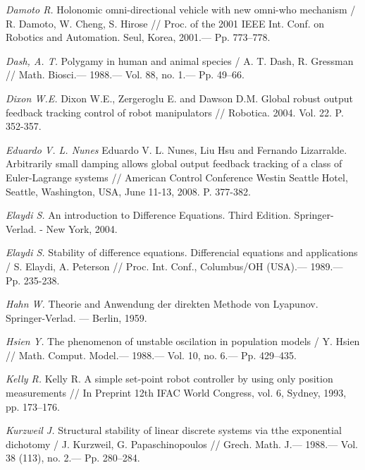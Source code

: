 \begin{thebibliography}{10}
	{\it Damoto R.} Holonomic omni-directional vehicle with new omni-who mechanism / R. Damoto, W. Cheng, S. Hirose // Proc. of the 2001 IEEE Int. Conf. on Robotics and Automation. Seul, Korea, 2001.— Pp. 773–778.
	
	
	{\it Dash, A. T.} Polygamy in human and animal species / A. T. Dash, R. Gressman // Math. Biosci.— 1988.— Vol. 88, no. 1.— Pp. 49–66.
	
	{\it Dixon W.E.} Dixon W.E., Zergeroglu E. and Dawson D.M. Global robust output feedback tracking control of robot manipulators // Robotica. 2004. Vol. 22. P. 352-357.
	
	{\it Eduardo V. L. Nunes} Eduardo V. L. Nunes, Liu Hsu and Fernando Lizarralde. Arbitrarily small damping allows global output feedback tracking of a class of Euler-Lagrange systems // American Control Conference Westin Seattle Hotel, Seattle, Washington, USA, June 11-13, 2008. P. 377-382.
	
	{\it Elaydi S.} An introduction to Difference Equations. Third Edition. Springer-Verlad. - New York, 2004.
	
	{\it Elaydi S.} Stability of difference equations. Differencial equations and applications / S. Elaydi, A. Peterson // Proc. Int. Conf., Columbus/OH (USA).— 1989.— Pp. 235-238.
	
	{\it Hahn W.} Theorie and Anwendung der direkten Methode von Lyapunov. Springer-Verlad. — Berlin, 1959.
	
	{\it Hsien Y.} The phenomenon of unstable oscilation in population models / Y. Hsien // Math. Comput. Model.— 1988.— Vol. 10, no. 6.— Pp. 429–435.
	
	
	
	{\it Kelly R.} Kelly R. A simple set-point robot controller by using only position measurements // In Preprint 12th IFAC World Congress, vol. 6, Sydney, 1993, pp. 173–176.
	
	{\it Kurzweil J.} Structural stability of linear discrete systems via tthe exponential dichotomy / J. Kurzweil, G. Papaschinopoulos // Grech. Math. J.— 1988.— Vol. 38 (113), no. 2.— Pp. 280–284.
	

\end{thebibliography}
